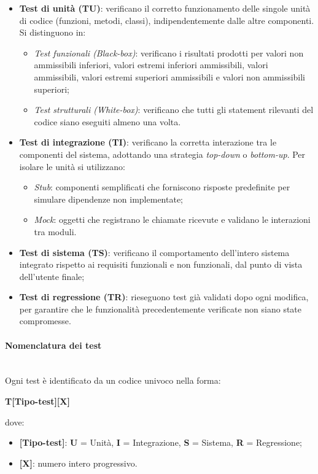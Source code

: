 \documentclass[10pt, letterpaper]{article}
\newcommand{\trisubsection}[1]{\paragraph{#1}\mbox{}\\}
\begin{document}
\begin{itemize}
    \item \textbf{Test di unità (TU)}: verificano il corretto funzionamento delle singole unità di codice (funzioni, metodi, classi), indipendentemente dalle altre componenti. Si distinguono in:
    \begin{itemize}
        \item \textit{Test funzionali (Black-box)}: verificano i risultati prodotti per valori non ammissibili inferiori, valori estremi inferiori ammissibili, valori ammissibili, valori estremi superiori ammissibili e valori non ammissibili superiori;
        \item \textit{Test strutturali (White-box)}: verificano che tutti gli statement rilevanti del codice siano eseguiti almeno una volta.
    \end{itemize}
    \item \textbf{Test di integrazione (TI)}: verificano la corretta interazione tra le componenti del sistema, adottando una strategia \textit{top-down} o \textit{bottom-up}. Per isolare le unità si utilizzano:
    \begin{itemize}
        \item \textit{Stub}: componenti semplificati che forniscono risposte predefinite per simulare dipendenze non implementate;
        \item \textit{Mock}: oggetti che registrano le chiamate ricevute e validano le interazioni tra moduli.
    \end{itemize}
    \item \textbf{Test di sistema (TS)}: verificano il comportamento dell'intero sistema integrato rispetto ai requisiti funzionali e non funzionali, dal punto di vista dell'utente finale;
    \item \textbf{Test di regressione (TR)}: rieseguono test già validati dopo ogni modifica, per garantire che le funzionalità precedentemente verificate non siano state compromesse.
\end{itemize}

\trisubsection{Nomenclatura dei test}
Ogni test è identificato da un codice univoco nella forma:
\begin{center}
    \textbf{T[Tipo-test][X]}
\end{center}
dove:
\begin{itemize}
    \item \textbf{[Tipo-test]}: \textbf{U} = Unità, \textbf{I} = Integrazione, \textbf{S} = Sistema, \textbf{R} = Regressione;
    \item \textbf{[X]}: numero intero progressivo.
\end{itemize}
\end{document}
